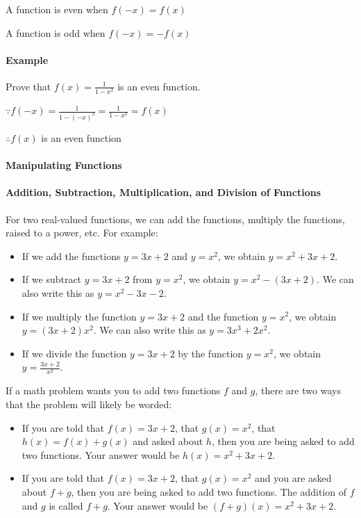 A function is even when $f(-x) = f(x)$ 

A function is odd when $f(-x) = -f(x)$

\paragraph{Example}

Prove that $f(x) = \frac{1}{1 - x^2}$ is an even function.

$\because f(-x) = \frac{1}{1 - (-x)^2} = \frac{1}{1 - x^2} = f(x)$

$\therefore f(x)$ is an even function

\paragraph{Manipulating Functions}

\paragraph{Addition, Subtraction, Multiplication, and Division of Functions}

For two real-valued functions, we can add the functions, multiply the functions, raised to a power, etc. For example:

\begin{itemize}
    \item If we add the functions $y = 3x + 2$ and $y = x^2$, we obtain $y = x^2 + 3x + 2$.
    \item If we subtract $y = 3x + 2$ from $y = x^2$, we obtain $y = x^2 - (3x + 2)$. We can also write this as $y = x^2 - 3x - 2$.
    \item If we multiply the function $y = 3x + 2$ and the function $y = x^2$, we obtain $y = (3x + 2)x^2$. We can also write this as $y = 3x^3 + 2x^2$.
    \item If we divide the function $y = 3x + 2$ by the function $y = x^2$, we obtain $y = \frac{3x + 2}{x^2}$.
\end{itemize}

If a math problem wants you to add two functions $f$ and $g$, there are two ways that the problem will likely be worded:

\begin{itemize}
    \item If you are told that $f(x) = 3x + 2$, that $g(x) = x^2$, that $h(x) = f(x) + g(x)$ and asked about $h$, then you are being asked to add two functions. Your answer would be $h(x) = x^2 + 3x + 2$.
    \item If you are told that $f(x) = 3x + 2$, that $g(x) = x^2$ and you are asked about $f + g$, then you are being asked to add two functions. The addition of $f$ and $g$ is called $f + g$. Your answer would be $(f + g)(x) = x^2 + 3x + 2$.
\end{itemize}

